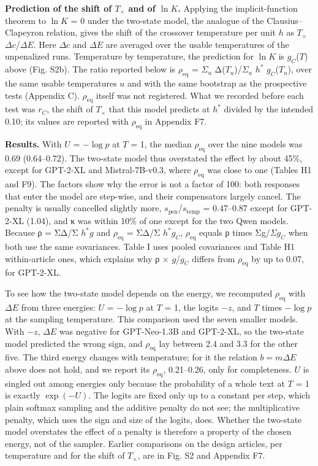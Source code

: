 \documentclass[aps,prx,onecolumn,superscriptaddress,longbibliography]{revtex4-2}
\begin{document}
\textbf{Prediction of the shift of \(T_{\times}\) and of \(\ln K\).} Applying the implicit-function theorem to \(\ln K\) = 0 under the two-state model, the analogue of the Clausius--Clapeyron relation, gives the shift of the crossover temperature per unit \(h\) as \(T_{\times}\) \(\Delta c\)/\(\Delta E\). Here \(\Delta c\) and \(\Delta E\) are averaged over the usable temperatures of the unpenalized runs. Temperature by temperature, the prediction for \(\ln K\) is \(g_{C}\)(\(T\)) above (Fig. S2b). The ratio reported below is \(\rho_{\mathrm{eq}}\) = \(\Sigma_{u}\) Δ(\(T_{u}\))/\(\Sigma_{u}\) \(h^*\) \(g_{C}\)(\(T_{u}\)), over the same usable temperatures \(u\) and with the same bootstrap as the prospective tests (Appendix C). \(\rho_{\mathrm{eq}}\) itself was not registered. What we recorded before each test was \(r_{C}\), the shift of \(T_{\times}\) that this model predicts at \(h^*\) divided by the intended 0.10; its values are reported with \(\rho_{\mathrm{eq}}\) in Appendix F7.

\textbf{Results.} With \(U\) = \(-\log p\) at \(T\) = 1, the median \(\rho_{\mathrm{eq}}\) over the nine models was 0.69 (0.64--0.72). The two-state model thus overstated the effect by about 45\%, except for GPT-2-XL and Mistral-7B-v0.3, where \(\rho_{\mathrm{eq}}\) was close to one (Tables H1 and F9). The factors show why the error is not a factor of 100: both responses that enter the model are step-wise, and their compensators largely cancel. The penalty is usually cancelled slightly more, \(s_{\mathrm{pen}}\)/\(s_{\mathrm{temp}}\) = 0.47--0.87 except for GPT-2-XL (1.04), and κ was within 10\% of one except for the two Qwen models. Because ρ = ΣΔ/Σ \(h^*\)\(g\) and \(\rho_{\mathrm{eq}}\) = ΣΔ/Σ \(h^*\)\(g_{C}\), \(\rho_{\mathrm{eq}}\) equals ρ times Σg/\(\Sigma g_{C}\) when both use the same covariances. Table I uses pooled covariances and Table H1 within-article ones, which explains why ρ × \(g\)/\(g_{C}\) differs from \(\rho_{\mathrm{eq}}\) by up to 0.07, for GPT-2-XL.

To see how the two-state model depends on the energy, we recomputed \(\rho_{\mathrm{eq}}\) with \(\Delta E\) from three energies: \(U\) = \(-\log p\) at \(T\) = 1, the logits \(-z\), and \(T\) times \(-\log p\) at the sampling temperature. This comparison used the seven smaller models. With \(-z\), \(\Delta E\) was negative for GPT-Neo-1.3B and GPT-2-XL, so the two-state model predicted the wrong sign, and \(\rho_{\mathrm{eq}}\) lay between 2.4 and 3.3 for the other five. The third energy changes with temperature; for it the relation \(b=m\Delta E\) above does not hold, and we report its \(\rho_{\mathrm{eq}}\), 0.21--0.26, only for completeness. \(U\) is singled out among energies only because the probability of a whole text at \(T\) = 1 is exactly \(\exp(-U)\). The logits are fixed only up to a constant per step, which plain softmax sampling and the additive penalty do not see; the multiplicative penalty, which uses the sign and size of the logits, does. Whether the two-state model overstates the effect of a penalty is therefore a property of the chosen energy, not of the sampler. Earlier comparisons on the design articles, per temperature and for the shift of \(T_{\times}\), are in Fig. S2 and Appendix F7.
\end{document}

